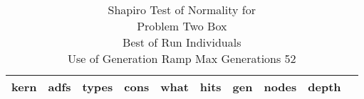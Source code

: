 \begin{table}[H]
\caption{Shapiro Test of Normality for \\ Problem  Two Box \\Best of Run Individuals \\ Use of Generation Ramp  Max Generations 52\\}
\begin{center}
\scalebox{0.8} %
{
\begin{tabular}{lrrrrrrrrr}
\hline
kern & adfs & types & cons & what & hits & gen & nodes & depth \\
\hline


\end{tabular}
}
\end{center}
\end{table}

